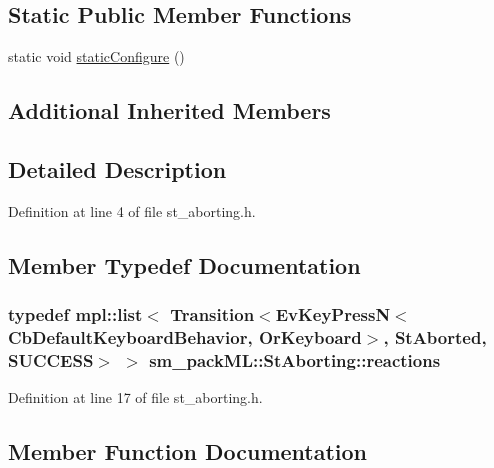 \subsection*{Static Public Member Functions}
\begin{DoxyCompactItemize}
\item 
static void \hyperlink{structsm__packML_1_1StAborting_a5aee0e07b9d76338736e549f39e6784a}{static\+Configure} ()
\end{DoxyCompactItemize}
\subsection*{Additional Inherited Members}


\subsection{Detailed Description}


Definition at line 4 of file st\+\_\+aborting.\+h.



\subsection{Member Typedef Documentation}
\subsubsection[{\texorpdfstring{reactions}{reactions}}]{\setlength{\rightskip}{0pt plus 5cm}typedef mpl\+::list$<$ Transition$<$Ev\+Key\+PressN$<$Cb\+Default\+Keyboard\+Behavior, {\bf Or\+Keyboard}$>$, {\bf St\+Aborted}, {\bf S\+U\+C\+C\+E\+SS}$>$ $>$ {\bf sm\+\_\+pack\+M\+L\+::\+St\+Aborting\+::reactions}}\hypertarget{structsm__packML_1_1StAborting_a45895613faad478b7cdbab9f0b8cb7aa}{}\label{structsm__packML_1_1StAborting_a45895613faad478b7cdbab9f0b8cb7aa}


Definition at line 17 of file st\+\_\+aborting.\+h.



\subsection{Member Function Documentation}
